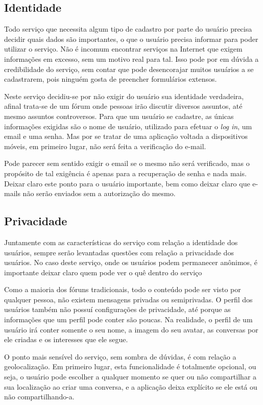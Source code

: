 \documentclass[diss]{template/setrem}
\begin{document}
\subsection{Identidade}
Todo serviço que necessita algum tipo de cadastro por parte do usuário precisa decidir quais dados são importantes, o que o usuário precisa informar para poder utilizar o serviço. Não é incomum encontrar serviços na Internet que exigem informações em excesso, sem um motivo real para tal. Isso pode por em dúvida a credibilidade do serviço, sem contar que pode desencorajar muitos usuários a se cadastrarem, pois ninguém gosta de preencher formulários extensos.

Neste serviço decidiu-se por não exigir do usuário sua identidade verdadeira, afinal trata-se de um fórum onde pessoas irão discutir diversos assuntos, até mesmo assuntos controversos. Para que um usuário se cadastre, as únicas informações exigidas são o nome de usuário, utilizado para efetuar o \emph{log in}, um email e uma senha. Mas por se tratar de uma aplicação voltada a dispositivos móveis, em primeiro lugar, não será feita a verificação do e-mail.

Pode parecer sem sentido exigir o email se o mesmo não será verificado, mas o propósito de tal exigência é apenas para a recuperação de senha e nada mais. Deixar claro este ponto para o usuário importante, bem como deixar claro que e-mails não serão enviados sem a autorização do mesmo.

\subsection{Privacidade}
Juntamente com as características do serviço com relação a identidade dos usuários, sempre serão levantadas questões com relação a privacidade dos usuários. No caso deste serviço, onde os usuários podem permanecer anônimos, é importante deixar claro quem pode ver o quê dentro do serviço

Como a maioria dos fóruns tradicionais, todo o conteúdo pode ser visto por qualquer pessoa, não existem mensagens privadas ou semiprivadas. O perfil dos usuários também não possuí configurações de privacidade, até porque as informações que um perfil pode conter são poucas. Na realidade, o perfil de um usuário irá conter somente o seu nome, a imagem do seu avatar, as conversas por ele criadas e os interesses que ele segue.

O ponto mais sensível do serviço, sem sombra de dúvidas, é com relação a geolocalização. Em primeiro lugar, esta funcionalidade é totalmente opcional, ou seja, o usuário pode escolher a qualquer momento se quer ou não compartilhar a sua localização ao criar uma conversa, e a aplicação deixa explícito se ele está ou não compartilhando-a.
\end{document}
